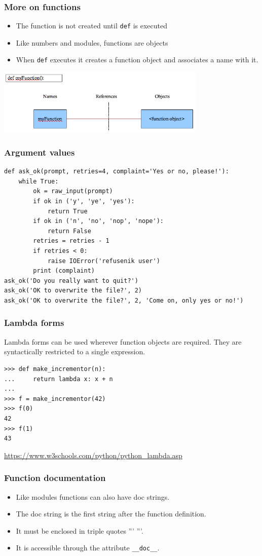 \documentclass{beamer}
\begin{document}
\begin{frame}
\frametitle{More on functions}
\begin{itemize}
\item The function is not created until \texttt{def} is executed
\item Like numbers and modules, functions are objects
\item When \texttt{def} executes it creates a function object and associates a name with it.
\end{itemize}
\begin{center}
\includegraphics[width=10cm]{functions_1}
\end{center}
\end{frame}

\begin{frame}[containsverbatim]
\frametitle{Argument values}
\begin{lstlisting}
def ask_ok(prompt, retries=4, complaint='Yes or no, please!'):
    while True:
        ok = raw_input(prompt)
        if ok in ('y', 'ye', 'yes'):
            return True
        if ok in ('n', 'no', 'nop', 'nope'):
            return False
        retries = retries - 1
        if retries < 0:
            raise IOError('refusenik user')
        print (complaint)
ask_ok('Do you really want to quit?')
ask_ok('OK to overwrite the file?', 2)
ask_ok('OK to overwrite the file?', 2, 'Come on, only yes or no!')
\end{lstlisting}
\end{frame}

\begin{frame}[containsverbatim]
\frametitle{Lambda forms}
Lambda forms can be used wherever function objects are required. They are syntactically restricted to a single expression. 
\begin{lstlisting}
>>> def make_incrementor(n):
...     return lambda x: x + n
...
>>> f = make_incrementor(42)
>>> f(0)
42
>>> f(1)
43
\end{lstlisting}
\url{https://www.w3schools.com/python/python_lambda.asp}
\end{frame}

\begin{frame}
\frametitle{Function documentation}
\begin{itemize}
\item Like modules functions can also have doc strings.
\item The doc string is the first string after the function definition.
\item It must be enclosed in triple quotes ''' '''.
\item It is accessible through the attribute \texttt{\_\_doc\_\_}.
\end{itemize}
\end{frame}
\end{document}
